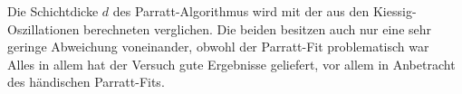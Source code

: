 \noindent
Die Schichtdicke $d$ des Parratt-Algorithmus wird mit der aus den Kiessig-Oszillationen berechneten verglichen. 
Die beiden besitzen auch nur eine sehr geringe Abweichung voneinander, obwohl der Parratt-Fit problematisch war\\
Alles in allem hat der Versuch gute Ergebnisse geliefert, vor allem in Anbetracht des händischen Parratt-Fits.
\newpage

